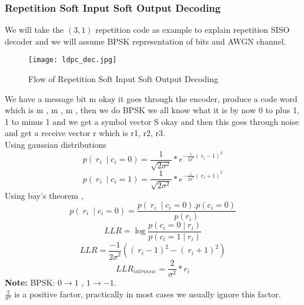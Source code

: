 \subsubsection{Repetition Soft Input Soft Output Decoding}
We will take the $(3, 1)$ repetition code as example to explain repetition SISO decoder and we will assume BPSK representation of bits and AWGN channel.
\begin{figure}[h]
    \centering
    \texttt{[image: ldpc\_dec.jpg]}
    \caption{Flow of Repetition Soft Input Soft Output Decoding}
    \label{fig:flow of LDPC RSISOD}
\end{figure}
We have a message bit m okay it goes through the encoder, produce a code word which is m , m , m  , then we do BPSK we all know what it is by now 0 to plus 1, 1 to  minus 1 and we get a symbol vector S okay and then this goes through noise and get a receive vector r which is r1, r2, r3.\\
Using gaussian distributions
\[ p\left({\ r}_i\ \middle| c_i=0\right)=\frac{1}{\sqrt{2\sigma^2}}\ast e^{{-\frac{1}{{2\sigma}^2}({\ r}_i-1)}^2} \]
\[ p\left({\ r}_i\ \middle| c_i=1\right)=\frac{1}{\sqrt{2\sigma^2}}\ast e^{{-\frac{1}{{2\sigma}^2}({\ r}_i+1)}^2} \]
Using bay's theorem ,
\[p\left({\ r}_i\ \middle| c_i=0\right)=\frac{p\left({\ r}_i\ \middle| c_i=0\right).p(c_i=0)}{p(r_i)}\]
\[LLR=\log\frac{p\left(c_i=0\middle| r_i\right)}{p\left(c_i=1\middle| r_i\right)}\]
\[LLR=\frac{-1}{{2\sigma}^2}\left(\left(\ r_i-1\right)^2-\left(\ r_i+1\right)^2\right)\]
\[{LLR}_{intrinsic}= \frac{2}{\sigma^2} \ast r_i\]
\textbf{Note:} BPSK: $0 \rightarrow 1$ , $1 \rightarrow -1$.\\
$\frac{2}{\sigma^2}$ is a positive factor, practically in most cases we usually ignore this factor.\\

